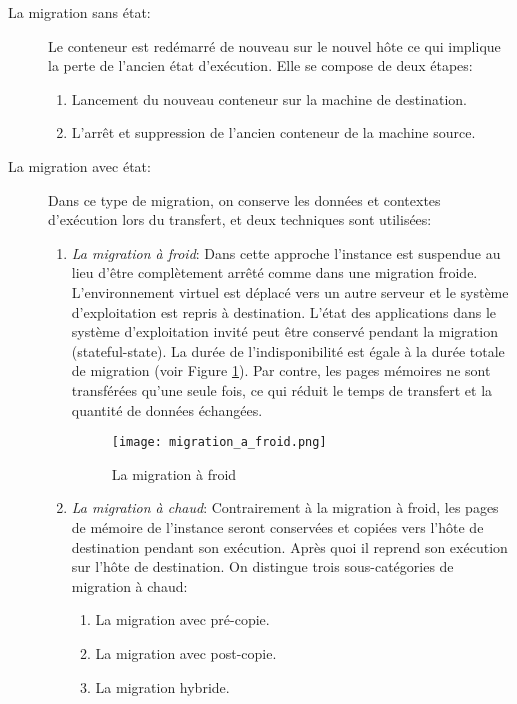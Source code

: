 \begin{description}
  \item[La migration sans état:] Le conteneur est redémarré de nouveau sur le nouvel hôte ce qui implique la perte de l'ancien état d'exécution. Elle se compose de deux étapes:
  \begin{enumerate}
    \item Lancement du nouveau conteneur sur la machine de destination.
    \item L'arrêt et suppression de l'ancien conteneur de la machine source.
  \end{enumerate}
  \item[La migration avec état:] Dans ce type de migration, on conserve les données et contextes d'exécution lors du transfert, et deux techniques sont utilisées:
    \begin{enumerate}
      \item \emph{La migration à froid}: Dans cette approche l'instance est suspendue au lieu d'être complètement arrêté comme dans une migration froide. L'environnement virtuel est déplacé vers un autre serveur et le système d'exploitation est repris à destination. L'état des applications dans le système d'exploitation invité peut être conservé pendant la migration (stateful-state). La durée de l'indisponibilité est égale à la durée totale de migration (voir Figure \ref{fig:migration_a_froid}). Par contre, les pages mémoires ne sont transférées qu'une seule fois, ce qui réduit le temps de transfert et la quantité de données échangées.
      \begin{figure}[H]
      \centering
      \texttt{[image: migration\_a\_froid.png]}
      \caption{La migration à froid \cite{puliafito2019}}
      \label{fig:migration_a_froid}
      \end{figure}
      \item \emph{La migration à chaud}: Contrairement à la migration à froid, les pages de mémoire de l'instance seront conservées et copiées vers l'hôte de destination pendant son exécution. Après quoi il reprend son exécution sur l'hôte de destination. On distingue trois sous-catégories de migration à chaud:
        \begin{enumerate}
          \item La migration avec pré-copie.
          \item La migration avec post-copie.
          \item La migration hybride.
        \end{enumerate}
      \end{enumerate}
\end{description}
